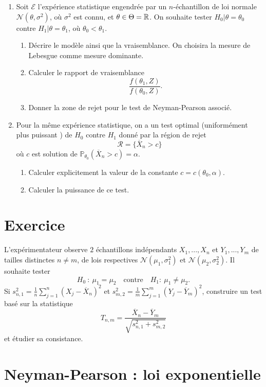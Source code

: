 \begin{enumerate}
\item Soit $\mathcal E$ l'expérience statistique engendrée par un $n$-échantillon de loi normale $\mathcal N (\theta,\sigma^2)$, où $\sigma^2$ est connu, et $\theta\in \Theta =\mathbb R$. On souhaite tester $H_0| \theta = \theta_0$ contre $H_1| \theta= \theta_1$, où $\theta_0<\theta_1$.
\begin{enumerate}
\item Décrire le modèle ainsi que la vraisemblance. On choisira la mesure de Lebesgue comme mesure dominante.
\item Calculer le rapport de vraisemblance \[\frac{f(\theta_1,Z)}{f(\theta_0,Z)}.\]
\item Donner la zone de rejet pour le test de Neyman-Pearson associé.
\end{enumerate}

\item Pour la même expérience statistique, on a un test optimal (uniformément plus puissant ) de $H_0$ contre $H_1$ donné par la région de rejet 
\[\mathcal R = \{\overline X_n >c\}\]
où $c$ est solution de $\mathbb P_{\theta_0}(\overline X_n > c)=\alpha$.
\begin{enumerate}
\item Calculer explicitement la valeur de la constante $c=c(\theta_0,\alpha)$.
\item Calculer la puissance de ce test.
\end{enumerate}
\end{enumerate}

\section{Exercice}
L'expérimentateur observe $2$ échantillons indépendants $X_1,...,X_n$ et $Y_1,...,Y_m$ de tailles distinctes $n\neq m$, de lois respectives $\mathcal N(\mu_1,\sigma^2_1)$ et $\mathcal N(\mu_2,\sigma^2_2)$. Il souhaite tester
\[H_0\ : \ \mu_1=\mu_2 \quad \text{contre} \quad H_1  : \ \mu_1\neq \mu_2 .\]
Si $s_{n,1}^2 = \frac{1}{n}\sum_{j=1}^n (X_j-\overline X_n)^2$ et $s_{m,2}^2 = \frac{1}{m}\sum_{j=1}^m (Y_j-\overline Y_m)^2$, construire un test basé sur la statistique 
\[T_{n,m}=\frac{\overline X_n - \overline Y_m}{\sqrt{s_{n,1}^2+s_{m,2}^2}}\]
et étudier sa consistance.


\section{Neyman-Pearson : loi exponentielle}

